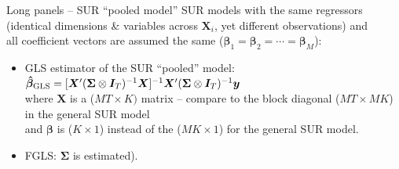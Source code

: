 \documentclass[usenames,dvipsnames]{beamer}
\begin{document}
\begin{frame}{Long panels -- SUR ``pooled model''}
\small
SUR models with the same regressors (identical dimensions \& variables across $\bm{X}_i$, yet different observations) and \\
all coefficient vectors are assumed the same ($\bm{\beta}_1=\bm{\beta}_2=\cdots=\bm{\beta}_M$):\\ \bigskip
\begin{itemize}
    \item GLS estimator of the SUR ``pooled'' model:\\ \bigskip
    $\bm{\hat{\beta}}_{\textnormal{GLS}} = [\bm{X}^{\prime} (\bm{\Sigma} \otimes \bm{I}_T)^{-1} \bm{X}]^{-1} \bm{X}^{\prime} (\bm{\Sigma} \otimes \bm{I}_T)^{-1} \bm{y}$ 
    \\ \medskip
    where $\bm{X}$ is a ($MT\times K)$ matrix -- compare to the block diagonal ($MT \times MK$) in the general SUR model\\ \medskip
    and $\bm{\beta}$ is ($K\times 1$) instead of the ($MK\times 1$) for the general SUR model.\\
    \bigskip
    \item FGLS: $\bm{\Sigma}$ is estimated).
\end{itemize}
\end{frame}
\end{document}
